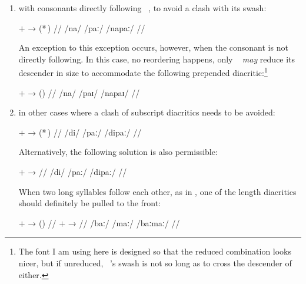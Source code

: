 \begin{enumerate}
\item with consonants directly following ~, to avoid a clash 
	with its swash:
	
	\ex[lingstyle=thex,everyglb=\itshape,numoffset=\leftmargin]
	\begingl
		\gla {} $+$  →  \quad
			(*\,) //
		\glb /na/ {} /paː/ {} /napaː/ {} {} //
	\endgl\xe
	
	An exception to this exception occurs, however, when the consonant is 
	not directly following. In this case, no reordering happens, only 
	~ \emph{may} reduce its descender in size to 
	accommodate the following prepended diacritic:\footnote{The font I am 
	using here is designed so that the reduced combination looks nicer, but 
	if unreduced, ~'s swash is not so long as to cross the 
	descender of  either.}
	
	\pex[lingstyle=thex,everyglb=\itshape,numoffset=\leftmargin]
	\begingl
		\gla {} $+$  →  \quad
			(\ques{}) //
		\glb /na/ {} /paɪ/ {} /napaɪ/ {} {} //
	\endgl\xe
	
\item in other cases where a clash of subscript diacritics needs to be avoided:

	\ex[lingstyle=thex,everyglb=\itshape,numoffset=\leftmargin]
	\begingl
		\gla {} $+$  →  \quad 
			(*\,) //
		\glb /di/ {} /paː/ {} /dipaː/ {} {} //
	\endgl\xe
	
	Alternatively, the following solution is also permissible:
	
	\ex[lingstyle=thex,everyglb=\itshape,numoffset=\leftmargin]%
	\begingl
		\gla {} $+$  → 
		 //
		\glb /di/ {} /paː/ {} /dipaː/ //
	\endgl\xe
	
	When two long syllables follow each other, as in 
	, one of the length diacritics should 
	definitely be pulled to the front:
	
	\ex[lingstyle=thex,everyglb=\upshape\Large,
	everyglc=\itshape,aboveglcskip=0.5em,numoffset=\leftmargin]
	\begingl
		\gla {}  $+$  →  \quad 
			(\ques{}) //
		  $+$  → 
			 //
		\glc {} /baː/ {} /maː/ {} /baːmaː/ //
	\endgl
	
	\xe

\end{enumerate}

